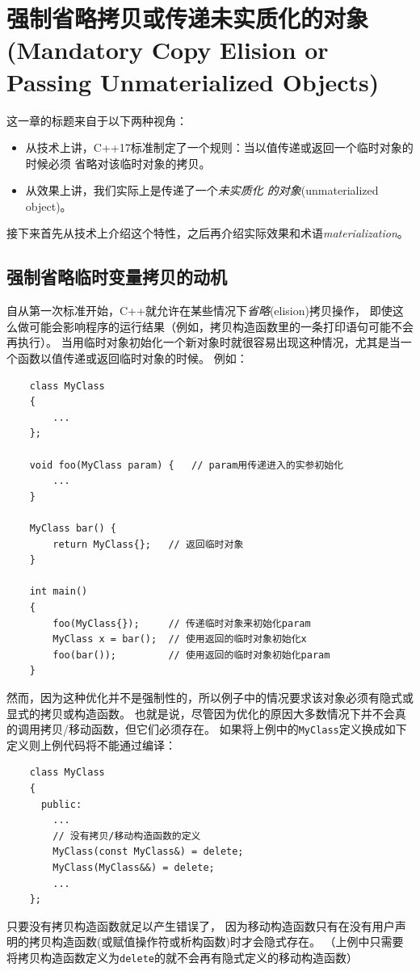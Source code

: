 \chapter[强制省略拷贝或传递未实质化的对象] {强制省略拷贝或传递未实质化的对象
(Mandatory Copy Elision or Passing Unmaterialized Objects)}\label{ch5}
这一章的标题来自于以下两种视角：
\begin{itemize}
    \item 从技术上讲，C++17标准制定了一个规则：当以值传递或返回一个临时对象的时候必须
    省略对该临时对象的拷贝。
    \item 从效果上讲，我们实际上是传递了一个\emph{未实质化 的对象}(unmaterialized object)。
\end{itemize}
接下来首先从技术上介绍这个特性，之后再介绍实际效果和术语\emph{materialization}。

\section{强制省略临时变量拷贝的动机}
自从第一次标准开始，C++就允许在某些情况下\emph{省略}(elision)拷贝操作，
即使这么做可能会影响程序的运行结果（例如，拷贝构造函数里的一条打印语句可能不会再执行）。
当用临时对象初始化一个新对象时就很容易出现这种情况，尤其是当一个函数以值传递或返回临时对象的时候。
例如：
\begin{lstlisting}
    class MyClass
    {
        ...
    };

    void foo(MyClass param) {   // param用传递进入的实参初始化
        ...
    }

    MyClass bar() {
        return MyClass{};   // 返回临时对象
    }

    int main()
    {
        foo(MyClass{});     // 传递临时对象来初始化param
        MyClass x = bar();  // 使用返回的临时对象初始化x
        foo(bar());         // 使用返回的临时对象初始化param
    }
\end{lstlisting}
然而，因为这种优化并不是强制性的，所以例子中的情况要求该对象必须有隐式或显式的拷贝或构造函数。
也就是说，尽管因为优化的原因大多数情况下并不会真的调用拷贝/移动函数，但它们必须存在。
如果将上例中的\texttt{MyClass}定义换成如下定义则上例代码将不能通过编译：
\begin{lstlisting}
    class MyClass
    {
      public:
        ...
        // 没有拷贝/移动构造函数的定义
        MyClass(const MyClass&) = delete;
        MyClass(MyClass&&) = delete;
        ...
    };
\end{lstlisting}
只要没有拷贝构造函数就足以产生错误了，
因为移动构造函数只有在没有用户声明的拷贝构造函数(或赋值操作符或析构函数)时才会隐式存在。
（上例中只需要将拷贝构造函数定义为\texttt{delete}的就不会再有隐式定义的移动构造函数）

